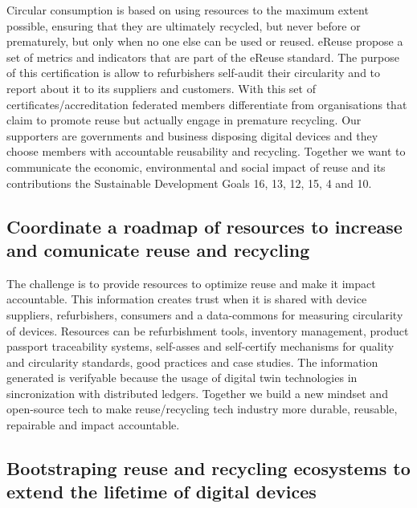 \documentclass[
]{book}
\begin{document}
Circular consumption is based on using resources to the maximum extent possible, ensuring that they are ultimately recycled, but never before or prematurely, but only when no one else can be used or reused. eReuse propose a set of metrics and indicators that are part of the eReuse standard. The purpose of this certification is allow to refurbishers self-audit their circularity and to report about it to its suppliers and customers. With this set of certificates/accreditation federated members differentiate from organisations that claim to promote reuse but actually engage in premature recycling. Our supporters are governments and business disposing digital devices and they choose members with accountable reusability and recycling. Together we want to communicate the economic, environmental and social impact of reuse and its contributions the Sustainable Development Goals 16, 13, 12, 15, 4 and 10.

\hypertarget{coordinate-a-roadmap-of-resources-to-increase-and-comunicate-reuse-and-recycling}{%
\subsection{Coordinate a roadmap of resources to increase and comunicate reuse and recycling}\label{coordinate-a-roadmap-of-resources-to-increase-and-comunicate-reuse-and-recycling}}

The challenge is to provide resources to optimize reuse and make it impact accountable. This information creates trust when it is shared with device suppliers, refurbishers, consumers and a data-commons for measuring circularity of devices. Resources can be refurbishment tools, inventory management, product passport traceability systems, self-asses and self-certify mechanisms for quality and circularity standards, good practices and case studies. The information generated is verifyable because the usage of digital twin technologies in sincronization with distributed ledgers. Together we build a new mindset and open-source tech to make reuse/recycling tech industry more durable, reusable, repairable and impact accountable.

\hypertarget{bootstraping-reuse-and-recycling-ecosystems-to-extend-the-lifetime-of-digital-devices}{%
\subsection{Bootstraping reuse and recycling ecosystems to extend the lifetime of digital devices}\label{bootstraping-reuse-and-recycling-ecosystems-to-extend-the-lifetime-of-digital-devices}}
\end{document}
